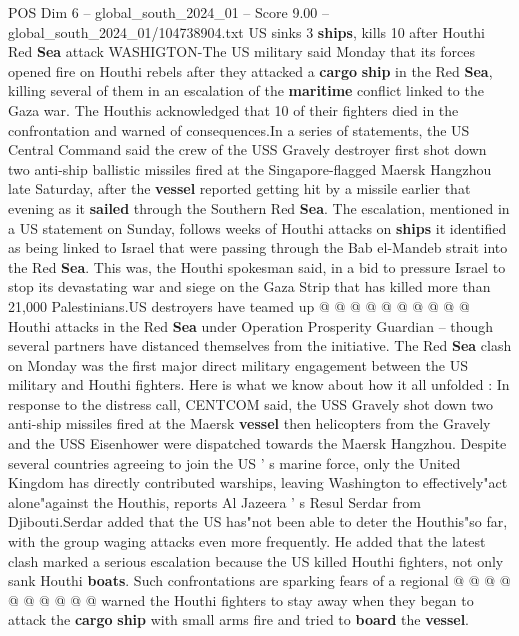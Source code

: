 \begin{textsample}{POS Dim 6 – global\_south\_2024\_01 – Score 9.00 – global\_south\_2024\_01/104738904.txt}  \label{ex:f6_pos_091}
US sinks 3 \textbf{ships}, kills 10 after Houthi Red \textbf{Sea} attack WASHIGTON-The US military said Monday that its forces opened fire on Houthi rebels after they attacked a \textbf{cargo} \textbf{ship} in the Red \textbf{Sea}, killing several of them in an escalation of the \textbf{maritime} conflict linked to the Gaza war.
The Houthis acknowledged that 10 of their fighters died in the confrontation and warned of consequences.In a series of statements, the US Central Command said the crew of the USS Gravely destroyer first shot down two anti-ship ballistic missiles fired at the Singapore-flagged Maersk Hangzhou late Saturday, after the \textbf{vessel} reported getting hit by a missile earlier that evening as it \textbf{sailed} through the Southern Red \textbf{Sea}.
The escalation, mentioned in a US statement on Sunday, follows weeks of Houthi attacks on \textbf{ships} it identified as being linked to Israel that were passing through the Bab el-Mandeb strait into the Red \textbf{Sea}.
This was, the Houthi spokesman said, in a bid to pressure Israel to stop its devastating war and siege on the Gaza Strip that has killed more than 21,000 Palestinians.US destroyers have teamed up @ @ @ @ @ @ @ @ @ @ Houthi attacks in the Red \textbf{Sea} under Operation Prosperity Guardian -- though several partners have distanced themselves from the initiative.
The Red \textbf{Sea} clash on Monday was the first major direct military engagement between the US military and Houthi fighters.
Here is what we know about how it all unfolded : In response to the distress call, CENTCOM said, the USS Gravely shot down two anti-ship missiles fired at the Maersk \textbf{vessel} then helicopters from the Gravely and the USS Eisenhower were dispatched towards the Maersk Hangzhou.
Despite several countries agreeing to join the US ' s marine force, only the United Kingdom has directly contributed warships, leaving Washington to effectively"act alone"against the Houthis, reports Al Jazeera ' s Resul Serdar from Djibouti.Serdar added that the US has"not been able to deter the Houthis"so far, with the group waging attacks even more frequently.
He added that the latest clash marked a serious escalation because the US killed Houthi fighters, not only sank Houthi \textbf{boats}.
Such confrontations are sparking fears of a regional @ @ @ @ @ @ @ @ @ @ warned the Houthi fighters to stay away when they began to attack the \textbf{cargo} \textbf{ship} with small arms fire and tried to \textbf{board} the \textbf{vessel}.

\end{textsample}
